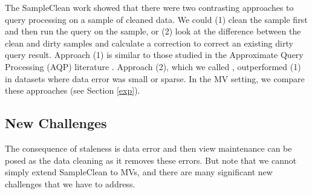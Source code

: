 The SampleClean work showed that there were two contrasting approaches to query processing on a sample of cleaned data.
We could (1) clean the sample first and then run the query on the sample, or (2) look at the difference between the clean and dirty samples and calculate a correction to correct an existing dirty query result. 
Approach (1) is similar to those studied in the Approximate Query Processing (AQP) literature \cite{OlkenR86,AgarwalMPMMS13, joshi2008materialized}.
Approach (2), which we called \nsc, outperformed (1) in datasets where data error was small or sparse.
In the MV setting, we compare these approaches (see Section \ref{exp}). 


\subsection{New Challenges}
The consequence of staleness is data error and then view maintenance can be posed as the data cleaning as it removes these errors.
But note that we cannot simply extend SampleClean to MVs, and there are many significant new challenges that we have to address.

